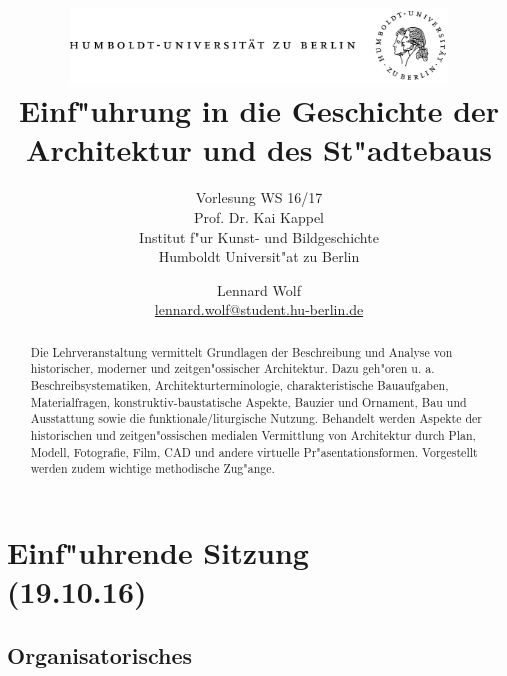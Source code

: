 \documentclass[emulatestandardclasses]{scrartcl}
\begin{document}
\title{
	\includegraphics*[width=0.75\textwidth]{images/hu_logo.png}\\
	\vspace{24pt}
	Einf"uhrung in die Geschichte der\\Architektur und des St"adtebaus}
\subtitle{Vorlesung WS 16/17\\
          Prof. Dr. Kai Kappel\\
          Institut f"ur Kunst- und Bildgeschichte \\ 
          Humboldt Universit"at zu Berlin}
\author{Lennard Wolf\\
        \href{mailto:lennard.wolf@student.hu-berlin.de}{lennard.wolf@student.hu-berlin.de}}
\maketitle
\begin{abstract}
Die Lehrveranstaltung vermittelt Grundlagen der Beschreibung und Analyse von historischer, moderner und zeitgen"ossischer Architektur. Dazu geh"oren u. a. Beschreibsystematiken, Architekturterminologie, charakteristische Bauaufgaben, Materialfragen, konstruktiv-baustatische Aspekte, Bauzier und Ornament, Bau und Ausstattung sowie die funktionale/liturgische Nutzung. Behandelt werden Aspekte der historischen und zeitgen"ossischen medialen Vermittlung von Architektur durch Plan, Modell, Fotografie, Film, CAD und andere virtuelle Pr"asentationsformen. Vorgestellt werden zudem wichtige methodische Zug"ange.
\end{abstract}
\newpage

\tableofcontents

\listoffigures
\newpage


\section{Einf"uhrende Sitzung\\(19.10.16)}



\subsection{Organisatorisches}
\end{document}
